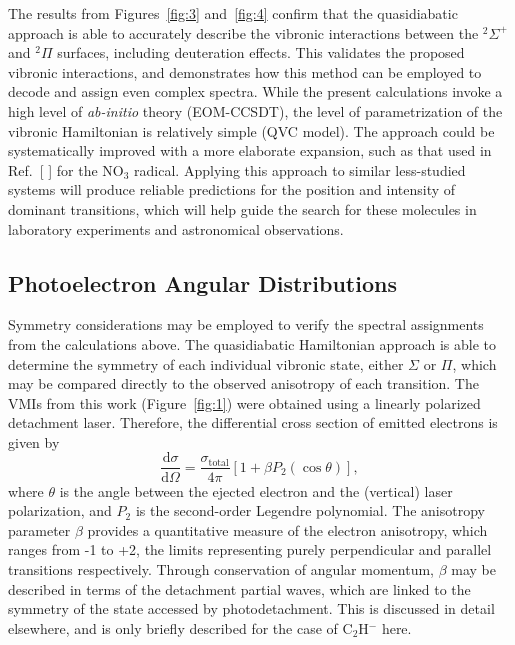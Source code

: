 \documentclass[journal=jpcafh,manuscript=article,layout=onecolumn, 12pt]{achemso}
\newcommand{\onlinecite}[1]{\hspace{-1 ex} \nocite{#1}\citenum{#1}}
\begin{document}
The results from Figures~\ref{fig:3} and~\ref{fig:4} confirm that the quasidiabatic approach is able to accurately describe the vibronic interactions between the $^2\Sigma^+$ and $^2\Pi$ surfaces, including deuteration effects. This validates the proposed vibronic interactions, and demonstrates how this method can be employed to decode and assign even complex spectra. While the present calculations invoke a high level of \emph{ab-initio} theory (EOM-CCSDT), the level of parametrization of the vibronic Hamiltonian is relatively simple (QVC model). The approach could be systematically improved with a more elaborate expansion, such as that used in Ref.~[\onlinecite{sim12}] for the NO$_3$ radical. Applying this approach to similar less-studied systems will produce reliable predictions for the position and intensity of dominant transitions, which will help guide the search for these molecules in laboratory experiments and astronomical observations. 




\subsection{Photoelectron Angular Distributions}
Symmetry considerations may be employed to verify the spectral assignments from the calculations above. The quasidiabatic Hamiltonian approach is able to determine the symmetry of each individual vibronic state, either $\Sigma$ or $\Pi$, which may be compared directly to the observed anisotropy of each transition. The VMIs from this work (Figure~\ref{fig:1}) were obtained using a linearly polarized detachment laser. Therefore, the differential cross section of emitted electrons is given by  
\begin{equation}
	\frac{\text{d}\sigma}{\text{d}\Omega}=\frac{\sigma_{\text{total}}}{4\pi}[1+\beta P_{2}(\cos\theta)],
	\label{eq:beta1}
\end{equation}
where $\theta$ is the angle between the ejected electron and the (vertical) 
laser polarization, and $P_2$ is the second-order Legendre polynomial. The anisotropy parameter $\beta$ provides a quantitative measure of the electron anisotropy, which ranges from -1 to +2, the limits representing purely perpendicular and parallel transitions respectively. Through conservation of angular momentum, $\beta$ may be described in terms of the detachment partial waves, which are linked to the symmetry of the state accessed by photodetachment. This is discussed in detail elsewhere\cite{khu14,law19}, and is only briefly described for the case of C$_2$H$^-$ here. 
\end{document}
